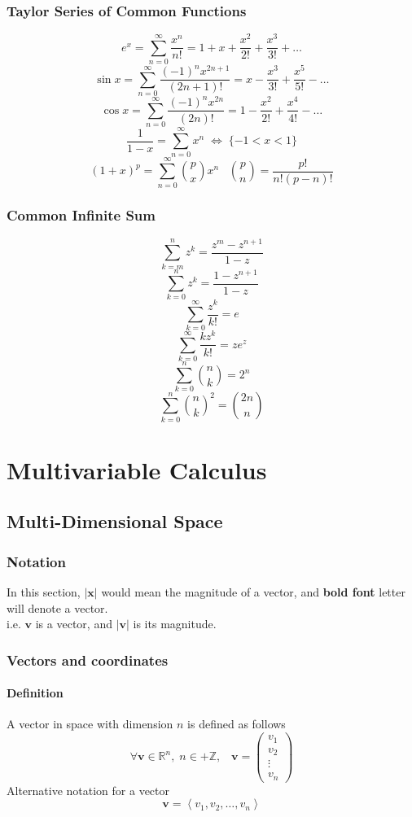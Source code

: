 \documentclass[12pt]{book}
\newcommand{\Z}{\mathbb{Z}}
\newcommand{\R}{\mathbb{R}}
\newcommand{\paren}[1]{\left( #1 \right)}
\newcommand{\tribkt}[1]{\left< #1 \right>}
\begin{document}
\subsection{Taylor Series of Common Functions}
\[
e^x = \sum_{n=0}^{\infty} \frac{x^n}{n!} = 1+x+\frac{x^2}{2!}+\frac{x^3}{3!}+\ldots
\]
\[
\sin x = \sum_{n=0}^{\infty} \frac{(-1)^n x^{2n+1}}{(2n+1)!}=x-\frac{x^3}{3!}+\frac{x^5}{5!} - \ldots
\]
\[
\cos x = \sum_{n=0}^{\infty} \frac{(-1)^n x^{2n}}{(2n)!}=1-\frac{x^2}{2!}+\frac{x^4}{4!}- \ldots
\]
\[
\frac{1}{1-x} = \sum_{n=0}^{\infty} x^n \; \iff \; \{-1 < x < 1\}
\]
\[
(1+x)^p = \sum_{n=0}^{\infty} {p \choose x} x^n \;\;\; {p \choose n} = \frac{p!}{n!(p-n)!}
\]
\subsection{Common Infinite Sum}
\[
\sum_{k=m}^{n} z^k = \frac{z^m - z^{n+1}}{1-z}
\]
\[
\sum_{k=0}^{n} z^k = \frac{1 - z^{n+1}}{1-z}
\]
\[
\sum_{k=0}^{\infty} \frac{z^k}{k!} = e
\]
\[
\sum_{k=0}^{\infty} \frac{kz^k}{k!} = ze^z
\]
\[
\sum_{k=0}^{n} {n \choose k} = 2^n
\]
\[
\sum_{k=0}^{n} {n \choose k}^2 = {2n \choose n}
\]


\chapter{Multivariable Calculus}

\section{Multi-Dimensional Space}
\subsection{Notation}
In this section, $|\textbf{x}|$ would mean the magnitude of a vector, and \textbf{bold font} letter will denote a vector.\\
\newline
i.e. $\textbf{v}$ is a vector, and $|\textbf{v}|$ is its magnitude. 
\subsection{Vectors and coordinates}
\subsubsection{Definition}
A vector in space with dimension $n$ is defined as follows
\[
\forall \textbf{v} \in \R^n, \; n \in +\Z, \;\;\; \textbf{v}= \paren{
\begin{matrix}
    v_1\\
    v_2\\
    \vdots\\
    v_n
\end{matrix}
}
\]
Alternative notation for a vector
\[
\textbf{v} = \tribkt{v_1, v_2,\ldots,v_n}
\]
\end{document}
